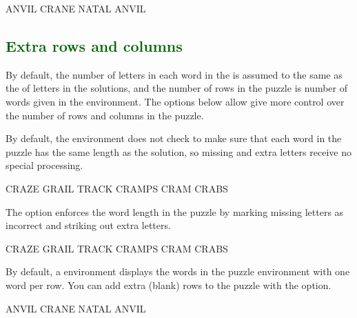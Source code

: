 \documentclass[svgnames]{report}
\newcommand\Section[1]{\subsection{\textcolor{DarkGreen}{#1}}}
\begin{document}
  \begin{example}
    \begin{wordle}[letterstyle={rounded corners}]{ANVIL}
      CRANE
      NATAL
      ANVIL
    \end{wordle}
  \end{example}

  \Section{Extra rows and columns}

  By default, the number of letters in each word in the 
  is assumed to the same as the of letters in the solutions, and the
  number of rows in the puzzle is number of words given in the
  environment. The options below allow give more control over the number
  of rows and columns in the puzzle.


  By default, the  environment does not check to make
  sure that each word in the puzzle has the same length as the solution,
  so missing and extra letters receive no special processing.

  \begin{example}
    \begin{wordle}{CRAZE}
      GRAIL
      TRACK
      CRAMPS
      CRAM
      CRABS
    \end{wordle}
  \end{example}

  The  option enforces the word length in the puzzle by
  marking missing letters as incorrect and striking out extra letters.

  \begin{example}
    \begin{wordle}[strict]{CRAZE}
      GRAIL
      TRACK
      CRAMPS
      CRAM
      CRABS
    \end{wordle}
  \end{example}

  By default, a  environment displays the words
  in the puzzle environment with one word per row. You can add extra
  (blank) rows to the puzzle with the  option.


  \begin{example}
    \begin{wordle}[rows=4]{ANVIL}
      CRANE
      NATAL
      ANVIL
    \end{wordle}
  \end{example}
\end{document}
